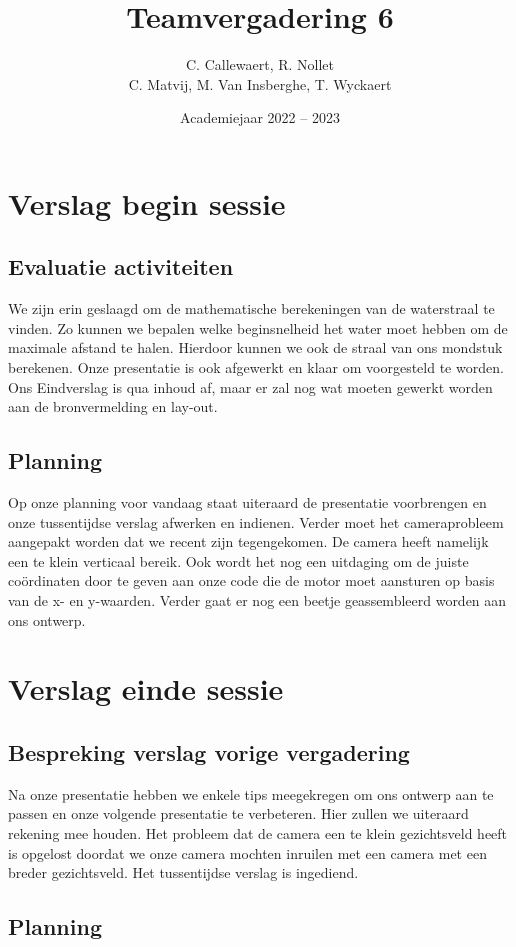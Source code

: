 \documentclass{kulakarticle}
\title{Teamvergadering 6}
\author{C. Callewaert, R. Nollet \\
	C. Matvij, M. Van Insberghe, T. Wyckaert }
\date{Academiejaar 2022 -- 2023}
\begin{document}
	\maketitle
	\section{Verslag begin sessie}
	
	\subsection{Evaluatie activiteiten}
	We zijn erin geslaagd om de mathematische berekeningen van de waterstraal te vinden. Zo kunnen we bepalen welke beginsnelheid het water moet hebben om de maximale afstand te halen. Hierdoor kunnen we ook de straal van ons mondstuk berekenen. Onze presentatie is ook afgewerkt en klaar om voorgesteld te worden. Ons Eindverslag is qua inhoud af, maar er zal nog wat moeten gewerkt worden aan de bronvermelding en lay-out.
	 
	
	\subsection{Planning}
	Op onze planning voor vandaag staat uiteraard de presentatie voorbrengen en onze tussentijdse verslag afwerken en indienen. Verder moet het cameraprobleem aangepakt worden dat we recent zijn tegengekomen. De camera heeft namelijk een te klein verticaal bereik. Ook wordt het nog een uitdaging om de juiste coördinaten door te geven aan onze code die de motor moet aansturen op basis van de x- en y-waarden. Verder gaat er nog een beetje geassembleerd worden aan ons ontwerp.

	
	\section{Verslag einde sessie}
	
	\subsection{Bespreking verslag vorige vergadering}
	Na onze presentatie hebben we enkele tips meegekregen om ons ontwerp aan te passen en onze volgende presentatie te verbeteren. Hier zullen we uiteraard rekening mee houden. Het probleem dat de camera een te klein gezichtsveld heeft is opgelost doordat we onze camera mochten inruilen met een camera met een breder gezichtsveld. Het tussentijdse verslag is ingediend.
	\subsection{Planning}


	

	
\end{document}
